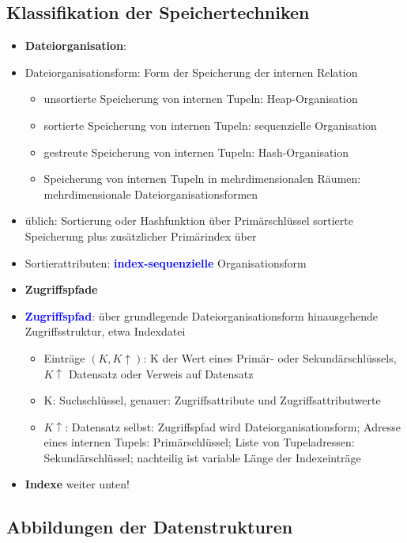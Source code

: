 \documentclass{scrartcl}
\newcommand{\key}[1]{{\textcolor{blue}{\textbf{#1}}}}
\begin{document}
\subsection{Klassifikation der Speichertechniken}

\begin{itemize}
	\itemsep0em
	\item[] \textbf{Dateiorganisation}:
	\item Dateiorganisationsform: Form der Speicherung der internen Relation
	\begin{itemize}
		\item unsortierte Speicherung von internen Tupeln: Heap-Organisation
		\item sortierte Speicherung von internen Tupeln: sequenzielle Organisation
		\item gestreute Speicherung von internen Tupeln: Hash-Organisation
		\item Speicherung von internen Tupeln in mehrdimensionalen Räumen: mehrdimensionale Dateiorganisationsformen
	\end{itemize}
	\item üblich: Sortierung oder Hashfunktion über Primärschlüssel sortierte Speicherung plus zusätzlicher Primärindex über
	\item Sortierattributen: \key{index-sequenzielle} Organisationsform
	\item[] \textbf{Zugriffspfade}
	\item \key{Zugriffspfad}: über grundlegende Dateiorganisationsform hinausgehende Zugriffsstruktur, etwa Indexdatei
	 \begin{itemize}
	 	\item Einträge $(K, K \uparrow)$: K der Wert eines Primär- oder Sekundärschlüssels, $K \uparrow$ Datensatz oder Verweis auf Datensatz
	 	\item K: Suchschlüssel, genauer: Zugriffsattribute und Zugriffsattributwerte
		 \item $K \uparrow$: Datensatz selbst: Zugriffspfad wird Dateiorganisationsform; Adresse eines internen Tupels: Primärschlüssel; Liste von Tupeladressen: Sekundärschlüssel; nachteilig ist variable Länge der Indexeinträge
	 \end{itemize}
	 \item[] \textbf{Indexe} weiter unten!
\end{itemize}

\subsection{Abbildungen der Datenstrukturen}
\end{document}
